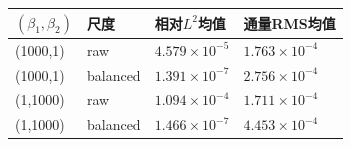 \begin{tabular}{llll}\toprule
$(\beta_1,\beta_2)$ & 尺度 & 相对$L^2$均值 & 通量RMS均值 \\ \midrule
(1000,1) & raw & $4.579\times10^{-5}$ & $1.763\times10^{-4}$ \\
(1000,1) & balanced & $1.391\times10^{-7}$ & $2.756\times10^{-4}$ \\
(1,1000) & raw & $1.094\times10^{-4}$ & $1.711\times10^{-4}$ \\
(1,1000) & balanced & $1.466\times10^{-7}$ & $4.453\times10^{-4}$ \\
\bottomrule\end{tabular}
